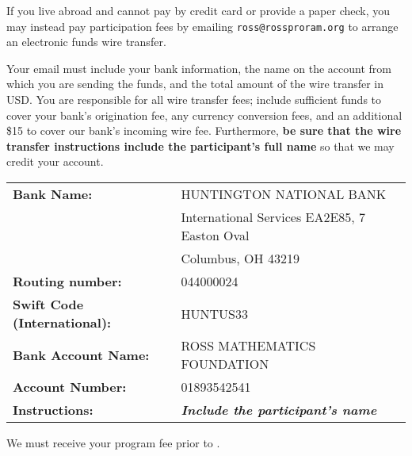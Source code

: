 \documentclass[11pt]{ross}
\begin{document}
If you live abroad and cannot pay by credit card or provide a paper
check, you may instead pay participation fees by emailing
\texttt{ross@rossproram.org} to arrange an electronic funds wire
transfer.

Your email must include your bank information, the name on the account
from which you are sending the funds, and the total amount of the wire
transfer in USD.  You are responsible for all wire transfer fees;
include sufficient funds to cover your bank's origination fee, any
currency conversion fees, and an additional \$15 to cover our bank's
incoming wire fee.  Furthermore, \textbf{be sure that the wire
  transfer instructions include the participant's full name} so that
we may credit your account.

\begin{tabular}{ll}
  \textbf{Bank Name:} &  HUNTINGTON NATIONAL BANK \\
&  International Services EA2E85, 7 Easton Oval \\
&  Columbus, OH 43219   \\
\textbf{Routing number:} &  044000024 \\
\textbf{Swift Code (International):} & HUNTUS33 \\
\textbf{Bank Account Name:} & ROSS MATHEMATICS FOUNDATION \\
\textbf{Account Number:} &  01893542541 \\
  \textbf{Instructions:} &  \textit{\textbf{Include the participant's name}} \\
\end{tabular}

We must receive your program fee prior to \feeduedate.
\end{document}
